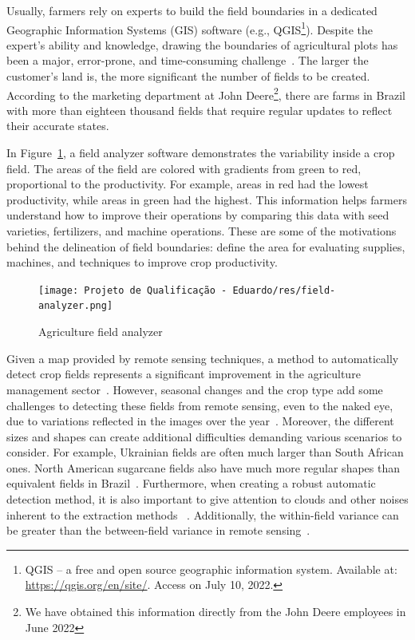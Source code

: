 \documentclass[12pt]{article}
\begin{document}
Usually, farmers rely on experts to build the field boundaries in a dedicated Geographic Information Systems (GIS) software (e.g., QGIS\footnote{QGIS -- a free and open source geographic information system. Available at: \url{https://qgis.org/en/site/}. Access on July 10, 2022.}). Despite the expert's ability and knowledge, drawing the boundaries of agricultural plots has been a major, error-prone, and time-consuming challenge~\cite{wagner2020}. The larger the customer's land is, the more significant the number of fields to be created. According to the marketing department at John Deere\footnote{We have obtained this information directly from the John Deere employees in June 2022}, there are farms in Brazil with more than eighteen thousand fields that require regular updates to reflect their accurate states. 

In Figure~\ref{figure:fieldanalyzer}, a field analyzer software demonstrates the variability inside a crop field. The areas of the field are colored with gradients from green to red, proportional to the productivity. For example, areas in red had the lowest productivity, while areas in green had the highest. This information helps farmers understand how to improve their operations by comparing this data with seed varieties, fertilizers, and machine operations. These are some of the motivations behind the delineation of field boundaries: define the area for evaluating supplies, machines, and techniques to improve crop productivity.

\begin{figure}[ht]
\centering
\texttt{[image: Projeto de Qualificação - Eduardo/res/field-analyzer.png]}
\caption{\label{figure:fieldanalyzer}Agriculture field analyzer\protect\footnotemark}
\end{figure}

Given a map provided by remote sensing techniques, a method to automatically detect crop fields represents a significant improvement in the agriculture management sector~\citep{garcia2017,garcia2018,garcia2019}. However, seasonal changes and the crop type add some challenges to detecting these fields from remote sensing, even to the naked eye, due to variations reflected in the images over the year~\citep{north2019}. Moreover, the different sizes and shapes can create additional difficulties demanding various scenarios to consider. For example, Ukrainian fields are often much larger than South African ones. North American sugarcane fields also have much more regular shapes than equivalent fields in Brazil~\cite{waldner2020}. Furthermore, when creating a robust automatic detection method, it is also important to give attention to clouds and other noises inherent to the extraction methods ~\citep{graesser2017,north2019}. Additionally, the within-field variance can be greater than the between-field variance in remote sensing~\cite{evans2002}.
\end{document}
